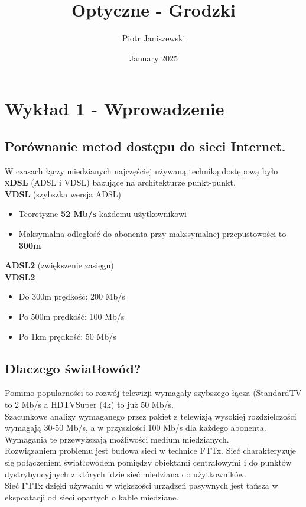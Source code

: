 \documentclass{article}
\title{Optyczne - Grodzki}
\author{Piotr Janiszewski}
\date{January 2025}
\begin{document}
\maketitle
\tableofcontents
\newpage

\section{Wykład 1 - Wprowadzenie}
\subsection{Porównanie metod dostępu do sieci Internet.}
W czasach łączy miedzianych najczęściej używaną techniką dostępową było \textbf{xDSL} (ADSL i VDSL) bazujące na architekturze punkt-punkt.\\
\textbf{VDSL} (szybszka wersja ADSL)
\begin{itemize}
  \item Teoretyzne \textbf{52 Mb/s} każdemu użytkownikowi
  \item Maksymalna odległość do abonenta przy makssymalnej przepustowości to \textbf{300m}
\end{itemize}

\textbf{ADSL2} (zwiększenie zasięgu) \\
\textbf{VDSL2}
\begin{itemize}
    \item Do 300m prędkość: 200 Mb/s
    \item Po 500m prędkość: 100 Mb/s
    \item Po 1km prędkość: 50 Mb/s
\end{itemize}

\subsection{Dlaczego światłowód?}
Pomimo popularności to rozwój telewizji wymagały szybszego łącza (StandardTV to 2 Mb/s a HDTVSuper (4k) to już 50 Mb/s.\\
Szacunkowe analizy wymaganego przez pakiet z telewizją wysokiej rozdzielczości wymagają 30-50 Mb/s, a w przyszłości 100 Mb/s dla każdego abonenta.
Wymagania te przewyższają możliwości medium miedzianych.\\
Rozwiązaniem problemu jest budowa sieci w technice FTTx. Sieć charakteryzuje się połączeniem światłowodem pomiędzy obiektami centralowymi i do punktów dystrybyucyjnych z których idzie sieć miedziana do użytkowników.\\
Sieć FTTx dzięki używaniu w większości urządzeń pasywnych jest tańsza w ekspoatacji od sieci opartych o kable miedziane.
\end{document}
